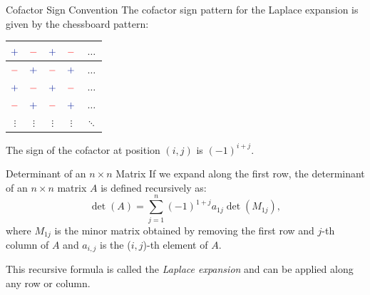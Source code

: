 \documentclass{beamer}
\begin{document}
		\begin{frame}{Cofactor Sign Convention}
		The cofactor sign pattern for the Laplace expansion is given by the chessboard pattern:
		\begin{center}
		\renewcommand{\arraystretch}{1.5}
		\begin{tabular}{|c|c|c|c|c|}
		\hline
		\cellcolor{blue!20}\( \textcolor{blue}{+} \) & \cellcolor{red!20}\( \textcolor{red}{-} \) & \cellcolor{blue!20}\( \textcolor{blue}{+} \) & \cellcolor{red!20}\( \textcolor{red}{-} \) & \cellcolor{blue!20}\( \dots \) \\ \hline
		\cellcolor{red!20}\( \textcolor{red}{-} \) & \cellcolor{blue!20}\( \textcolor{blue}{+} \) & \cellcolor{red!20}\( \textcolor{red}{-} \) & \cellcolor{blue!20}\( \textcolor{blue}{+} \) & \cellcolor{red!20}\( \dots \) \\ \hline
		\cellcolor{blue!20}\( \textcolor{blue}{+} \) & \cellcolor{red!20}\( \textcolor{red}{-} \) & \cellcolor{blue!20}\( \textcolor{blue}{+} \) & \cellcolor{red!20}\( \textcolor{red}{-} \) & \cellcolor{blue!20}\( \dots \) \\ \hline
		\cellcolor{red!20}\( \textcolor{red}{-} \) & \cellcolor{blue!20}\( \textcolor{blue}{+} \) & \cellcolor{red!20}\( \textcolor{red}{-} \) & \cellcolor{blue!20}\( \textcolor{blue}{+} \) & \cellcolor{red!20}\( \dots \) \\ \hline
		\( \vdots \) & \( \vdots \) & \( \vdots \) & \( \vdots \) & \( \ddots \) \\ \hline
		\end{tabular}
		\end{center}

		The sign of the cofactor at position \((i,j)\) is \( (-1)^{i+j} \).
		\end{frame}

		\begin{frame}{Determinant of an \(n \times n\) Matrix}
		If we expand along the first row, the determinant of an \(n \times n\) matrix \(A\) is defined recursively as:
		\begin{equation}
		\det(A) =
		\sum_{j=1}^{n} (-1)^{1+j} a_{1j} \det(M_{1j}),
		\end{equation}
		where \(M_{1j}\) is the minor matrix obtained by removing the first row and \(j\)-th column of \(A\) and \(a_{i,j}\) is the (\(i, j\))-th element of \(A\).

		This recursive formula is called the \emph{Laplace expansion} and can be applied along any row or column.
		\end{frame}
\end{document}
